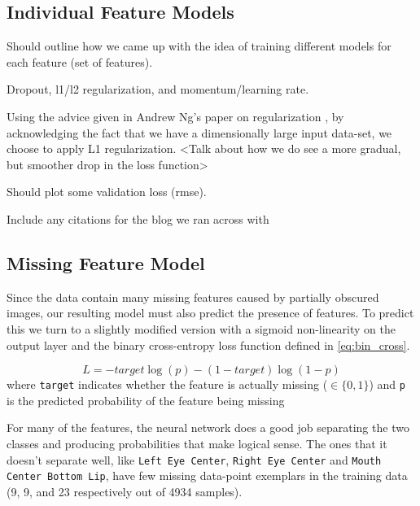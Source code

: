 \documentclass[journal]{IEEEtran}
\begin{document}
\subsection{Individual Feature Models}
Should outline how we came up with the idea of training different models for each feature (set of features).


Dropout, l1/l2 regularization, and momentum/learning rate.


Using the advice given in Andrew Ng's paper on regularization \cite{ng2004feature}, by acknowledging the fact that we have a dimensionally large input data-set, we choose to apply L1 regularization. <Talk about how we do see a more gradual, but smoother drop in the loss function>

Should plot some validation loss (rmse).

Include any citations for the blog we ran across with \cite{dnouri}

\subsection{Missing Feature Model}
Since the data contain many missing features caused by partially obscured images, our resulting model must also predict the presence of features.  To predict this we turn to a slightly modified version with a sigmoid non-linearity on the output layer and the binary cross-entropy loss function defined in \cref{eq:bin_cross}.

\[\label{eq:bin_cross}
 L = -target \log(p) - (1 - target) \log(1 - p)
\]
where \texttt{target} indicates whether the feature is actually missing ($\in \{0,1\}$) and \texttt{p} is the predicted probability of the feature being missing

For many of the features, the neural network does a good job separating the two classes and producing probabilities that make logical sense.  The ones that it doesn't separate well, like \texttt{Left Eye Center}, \texttt{Right Eye Center} and \texttt{Mouth Center Bottom Lip}, have few missing data-point exemplars in the training data (9, 9, and 23 respectively out of 4934 samples).
\end{document}
